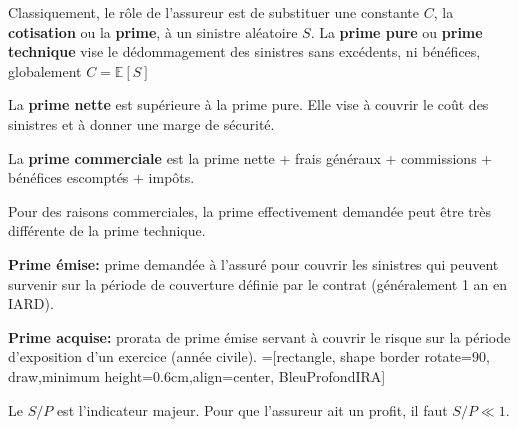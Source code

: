 \begin{f}
Classiquement, le rôle de l'assureur est de substituer une constante \(C\), la \textbf{cotisation} ou la \textbf{prime}, à un sinistre aléatoire \(S\).
La \textbf{prime pure} ou \textbf{prime technique} vise 
le dédommagement des sinistres sans excédents, ni bénéfices, globalement \(C= \mathbb{E}[S]\)
	
	La \textbf{prime nette} est supérieure à la prime pure. Elle vise à couvrir le coût des sinistres et à donner une marge de sécurité.
	
	La \textbf{prime commerciale} est la prime nette + frais généraux + commissions + bénéfices escomptés + impôts.
	
	Pour des raisons commerciales, la prime effectivement demandée peut être très différente de la prime technique.

	\textbf{Prime émise:} prime demandée à l'assuré pour couvrir les sinistres qui peuvent survenir sur la
période de couverture définie par le contrat (généralement 1 an en IARD).

\textbf{Prime acquise:} prorata de prime émise servant à couvrir le risque sur la période d'exposition
d'un exercice (année civile).
=[rectangle, shape border rotate=90, draw,minimum height=0.6cm,align=center, BleuProfondIRA]

\resizebox{\linewidth}{!}
{
}
Le \(S/P\) est l'indicateur majeur. Pour que l'assureur ait un profit, il faut \(S/P\ll 1\). 
\end{f}

